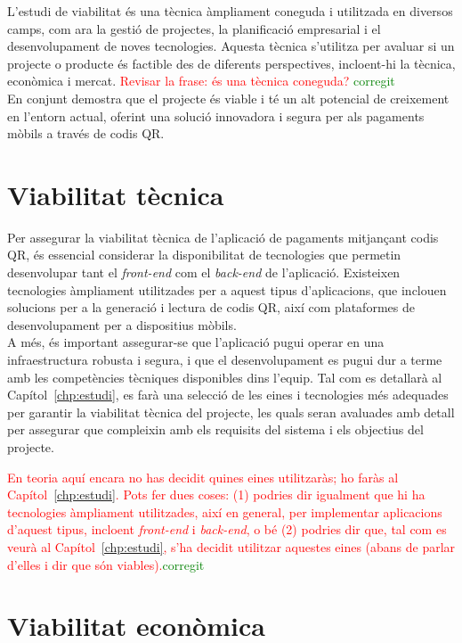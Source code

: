 \documentclass[a4paper,12pt,twoside]{ThesisStyle}
\newcommand{\pau}[1]{\textcolor{red}{#1}}
\newcommand{\sudan}[1]{\textcolor{green}{#1}}
\begin{document}
L'estudi de viabilitat és una tècnica àmpliament coneguda i utilitzada en diversos camps, com ara la gestió de projectes, la planificació empresarial i el desenvolupament de noves tecnologies. Aquesta tècnica s'utilitza per avaluar si un projecte o producte és factible des de diferents perspectives, incloent-hi la tècnica, econòmica i mercat. 
\pau{Revisar la frase: és una tècnica coneguda?} \sudan{corregit}\\ 

En conjunt demostra que el projecte és viable i té un alt potencial de creixement en l'entorn actual, oferint una solució innovadora i segura per als pagaments mòbils a través de codis QR.

\section{Viabilitat tècnica}
\label{subsec:Viabilitat tècnica}

Per assegurar la viabilitat tècnica de l'aplicació de pagaments mitjançant codis QR, és essencial considerar la disponibilitat de tecnologies que permetin desenvolupar tant el \textit{front-end} com el \textit{back-end} de l'aplicació. Existeixen tecnologies àmpliament utilitzades per a aquest tipus d'aplicacions, que inclouen solucions per a la generació i lectura de codis QR, així com plataformes de desenvolupament per a dispositius mòbils.\\

A més, és important assegurar-se que l'aplicació pugui operar en una infraestructura robusta i segura, i que el desenvolupament es pugui dur a terme amb les competències tècniques disponibles dins l'equip. Tal com es detallarà al Capítol~\ref{chp:estudi}, es farà una selecció de les eines i tecnologies més adequades per garantir la viabilitat tècnica del projecte, les quals seran avaluades amb detall per assegurar que compleixin amb els requisits del sistema i els objectius del projecte.

\pau{En teoria aquí encara no has decidit quines eines utilitzaràs; ho faràs al Capítol~\ref{chp:estudi}. Pots fer dues coses: (1) podries dir igualment que hi ha tecnologies àmpliament utilitzades, així en general, per implementar aplicacions d'aquest tipus, incloent \textit{front-end} i \textit{back-end}, o bé (2) podries dir que, tal com es veurà al Capítol~\ref{chp:estudi}, s'ha decidit utilitzar aquestes eines (abans de parlar d'elles i dir que són viables).}\sudan{corregit}

\section{Viabilitat econòmica}
\label{subsec:Viabilitat económica}
\end{document}
